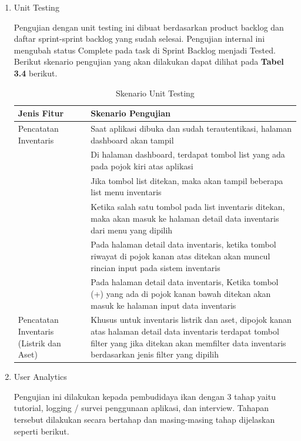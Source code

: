 \begin{enumerate}
	\item Unit Testing
	
	Pengujian dengan unit testing ini dibuat berdasarkan product backlog dan daftar sprint-sprint backlog yang sudah selesai. Pengujian internal ini mengubah status Complete pada task di Sprint Backlog menjadi Tested. Berikut skenario pengujian yang akan dilakukan dapat dilihat pada \textbf{Tabel 3.4} berikut.

	\begin{table}[H]	
		\begin{center}
			\caption{Skenario Unit Testing}
			\label{tab:table8}
			\begin{tabular}{|m{13em}|m{17em}|}
			\hline
			\textbf{Jenis Fitur} & \textbf{Skenario Pengujian} \\
			\hline
			Pencatatan Inventaris & Saat aplikasi dibuka dan sudah terautentikasi, halaman dashboard akan tampil \\
			\hline
			 & Di halaman dashboard, terdapat tombol list yang ada pada pojok kiri atas aplikasi \\
			\hline
			 & Jika tombol list ditekan, maka akan tampil beberapa list menu inventaris \\
			\hline
			& Ketika salah satu tombol pada list inventaris ditekan, maka akan masuk ke halaman detail data inventaris dari menu yang dipilih \\
			\hline
			& Pada halaman detail data inventaris, ketika tombol riwayat di pojok kanan atas ditekan akan muncul rincian input pada sistem inventaris \\
			\hline
			& Pada halaman detail data inventaris, Ketika tombol (+) yang ada di pojok kanan bawah ditekan akan masuk ke halaman input data inventaris \\
			\hline
			Pencatatan Inventaris (Listrik dan Aset) & Khusus untuk inventaris listrik dan aset, dipojok kanan atas halaman detail data inventaris terdapat tombol filter yang jika ditekan akan memfilter data inventaris berdasarkan jenis filter yang dipilih  \\
			\hline
			\end{tabular}
		\end{center}
	\end{table}

	\item User Analytics
	
	Pengujian ini dilakukan kepada pembudidaya ikan dengan 3 tahap yaitu tutorial, logging / survei penggunaan aplikasi, dan interview. Tahapan tersebut dilakukan secara bertahap dan masing-masing tahap dijelaskan seperti berikut.


\end{enumerate}
